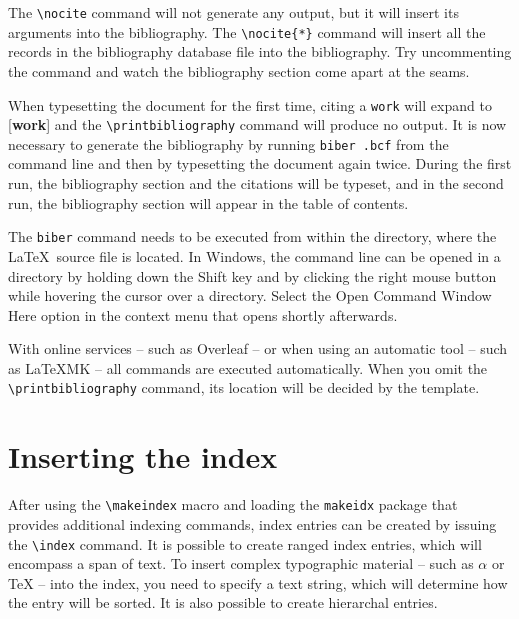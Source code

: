\documentclass[
  digital,     %
  twoside,     %
  lof,         %
  lot,         %
]{fithesis4}
\begin{document}
The \verb"\nocite" command will not generate any
output\nocite{muni}, but it will insert its arguments into
the bibliography. The \verb"\nocite{*}" command will insert all the
records in the bibliography database file into the bibliography.
Try uncommenting the command
and watch the bibliography section come apart at the seams.

When typesetting the document for the first time, citing a
\texttt{work} will expand to [\textbf{work}] and the
\verb"\printbibliography" command will produce no output. It is now
necessary to generate the bibliography by running \texttt{biber
\jobname.bcf} from the command line and then by typesetting the
document again twice. During the first run, the bibliography
section and the citations will be typeset, and in the second run,
the bibliography section will appear in the table of contents.

The \texttt{biber} command needs to be executed from within the
directory, where the \LaTeX\ source file is located. In Windows,
the command line can be opened in a directory by holding down the
\textsf{Shift} key and by clicking the right mouse button while
hovering the cursor over a directory.  Select the \textsf{Open
Command Window Here} option in the context menu that opens shortly
afterwards.

With online services -- such as Overleaf -- or when using an
automatic tool -- such as \LaTeX MK -- all commands are executed
automatically. When you omit the \verb"\printbibliography" command,
its location will be decided by the template.

  \printbibliography[heading=bibintoc] %

\chapter{Inserting the index}
After using the \verb"\makeindex" macro and loading the
\texttt{makeidx} package that provides additional indexing
commands, index entries can be created by issuing the \verb"\index"
command. It is possible to create ranged index
entries, which will encompass a span of text.
To insert complex typographic material -- such as $\alpha$
 or \TeX{}  --
into the index, you need to specify a text string, which will
determine how the entry will be sorted. It is also possible to
create hierarchal entries. 
\end{document}
